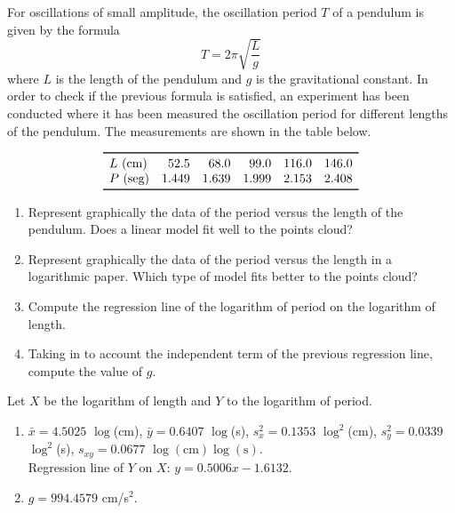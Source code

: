 {For oscillations of small amplitude, the oscillation period $T$ of a pendulum is given by the formula
\[
T = 2\pi\sqrt{\frac{L}{g}}
\]
where $L$ is the length of the pendulum and $g$ is the gravitational constant.
In order to check if the previous formula is satisfied, an experiment has been conducted where it has been measured the oscillation period for different lengths of the pendulum.
The measurements are shown in the table below.

\[
\begin{array}{lrrrrr}
\toprule
L\text{ (cm)} & 52.5 & 68.0 & 99.0 & 116.0 & 146.0 \\
P\text{ (seg)} & 1.449 & 1.639 & 1.999 & 2.153 & 2.408\\
\bottomrule
\end{array}
\]

\begin{enumerate}
\item Represent graphically the data of the period versus the length of the pendulum.
Does a linear model fit well to the points cloud?
\item Represent graphically the data of the period versus the length in a logarithmic paper.
Which type of model fits better to the points cloud?
\item Compute the regression line of the logarithm of period on the logarithm of length.
\item Taking in to account the independent term of the previous regression line, compute the value of $g$.
\end{enumerate}
}
{Let $X$ be the logarithm of length and $Y$ to the logarithm of period.
\begin{enumerate}[start=3]
\item $\bar x=4.5025$ $\log$(cm), $\bar y=0.6407$ $\log$(s), $s_x^2=0.1353$ $\log^2$(cm), $s_y^2=0.0339$ $\log^2$(s), $s_{xy}=0.0677$ $\log(\mbox{cm})\log(\mbox{s})$.\\
Regression line of $Y$ on $X$: $y=0.5006x-1.6132$.
\item $g=994.4579$ cm/s$^2$.
\end{enumerate}
}
{}



